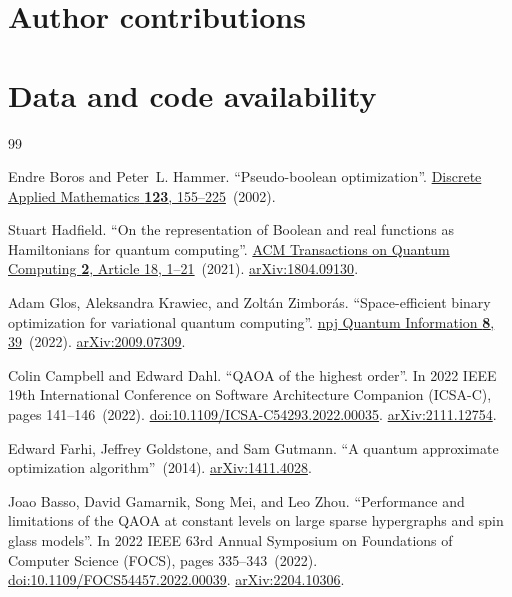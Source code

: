 \documentclass[a4paper,onecolumn,11pt,unpublished]{quantumarticle}
\newcommand{\blankcontent}{\noindent\mbox{}\par}
\theoremstyle{remark}
\begin{document}
\section*{Author contributions}
\blankcontent

\section*{Data and code availability}
\blankcontent





\begin{thebibliography}{99}

Endre Boros and Peter~L. Hammer.
\newblock ``Pseudo-boolean optimization''.
\newblock \href{https://dx.doi.org/10.1016/S0166-218X(01)00341-9}{Discrete Applied Mathematics {\bf 123}, 155--225}~(2002).

Stuart Hadfield.
\newblock ``On the representation of Boolean and real functions as Hamiltonians for quantum computing''.
\newblock \href{https://dx.doi.org/10.1145/3478519}{ACM Transactions on Quantum Computing {\bf 2}, Article 18, 1--21}~(2021).
\newblock \href{http://arxiv.org/abs/1804.09130}{arXiv:1804.09130}.

Adam Glos, Aleksandra Krawiec, and Zolt{\'a}n Zimbor{\'a}s.
\newblock ``Space-efficient binary optimization for variational quantum computing''.
\newblock \href{https://dx.doi.org/10.1038/s41534-022-00546-y}{npj Quantum Information {\bf 8}, 39}~(2022).
\newblock \href{http://arxiv.org/abs/2009.07309}{arXiv:2009.07309}.

Colin Campbell and Edward Dahl.
\newblock ``QAOA of the highest order''.
\newblock In 2022 IEEE 19th International Conference on Software Architecture Companion (ICSA-C), pages 141--146~(2022).
\newblock \href{https://dx.doi.org/10.1109/ICSA-C54293.2022.00035}{doi:10.1109/ICSA-C54293.2022.00035}.
\newblock \href{http://arxiv.org/abs/2111.12754}{arXiv:2111.12754}.

Edward Farhi, Jeffrey Goldstone, and Sam Gutmann.
\newblock ``A quantum approximate optimization algorithm''~(2014).
\newblock \href{http://arxiv.org/abs/1411.4028}{arXiv:1411.4028}.

Joao Basso, David Gamarnik, Song Mei, and Leo Zhou.
\newblock ``Performance and limitations of the QAOA at constant levels on large sparse hypergraphs and spin glass models''.
\newblock In 2022 IEEE 63rd Annual Symposium on Foundations of Computer Science (FOCS), pages 335--343~(2022).
\newblock \href{https://dx.doi.org/10.1109/FOCS54457.2022.00039}{doi:10.1109/FOCS54457.2022.00039}.
\newblock \href{http://arxiv.org/abs/2204.10306}{arXiv:2204.10306}.


\end{thebibliography}
\end{document}
